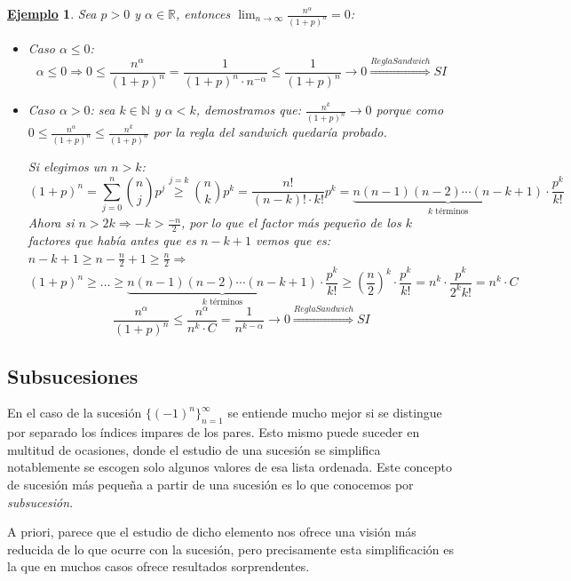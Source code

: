 \documentclass[10pt,a4paper,openright]{book}
\theoremstyle{break}
\newtheorem{ej}{\underline{Ejemplo}}[chapter]
\begin{document}
\begin{ej}
Sea $p>0$ y $\alpha\in \mathbb R$, entonces $\lim_{n\rightarrow\infty}\frac{n^\alpha}{(1+p)^n}=0$:
\begin{itemize}
\item Caso $\alpha\leq 0$:
$$\alpha\leq 0\Rightarrow 0\leq \frac{n^\alpha}{(1+p)^n}=\frac{1}{(1+p)^n\cdot n^{-\alpha}}\leq \frac{1}{(1+p)^n}\rightarrow 0\stackrel{Regla Sandwich}{\Rightarrow} SI$$

\item Caso $\alpha>0$: sea $k\in \mathbb N$ y $\alpha<k$, demostramos que: $\frac{n^k}{(1+p)^n}\rightarrow 0$ porque como  $0\leq \frac{n^\alpha}{(1+p)^n}\leq \frac{n^k}{(1+p)^n}$ por la regla del sandwich quedaría probado.\par

Si elegimos un $n>k$:
$$(1+p)^n=\sum_{j=0}^n \binom{n}{j} p^j \stackrel{j=k}{\geq} \binom{n}{k}p^k=\frac{n!}{(n-k)!\cdot k!}p^k=\underbrace{n(n-1)(n-2)\cdots(n-k+1)}_{k \mbox{ términos}}\cdot \frac{p^k}{k!}$$
Ahora si $n>2k\Rightarrow -k>\frac{-n}{2}$, por lo que el factor más pequeño de los $k$ factores que había antes que es $n-k+1$ vemos que es: $n-k+1\geq n-\frac{n}{2}+1\geq \frac{n}{2} \Rightarrow $
$$(1+p)^n\geq ... \geq \underbrace{n(n-1)(n-2)\cdots (n-k+1)}_{k \mbox{ términos}}\cdot \frac{p^k}{k!}\geq \left(\frac{n}{2}\right)^k\cdot \frac{p^k}{k!}=n^k\cdot \frac{p^k}{2^kk!}=n^k\cdot C$$
$$\frac{n^\alpha}{(1+p)^n}\leq \frac{n^\alpha}{n^k\cdot C}=\frac{1}{n^{k-\alpha}}\rightarrow 0\stackrel{Regla Sandwich}{\Rightarrow} SI$$
\end{itemize}
\end{ej}

\subsection{Subsucesiones}
\label{sub:subsucesiones}

En el caso de la sucesión $\{(-1)^n\}_{n=1}^\infty$ se entiende mucho mejor si se distingue por separado los índices impares de los pares. Esto mismo puede suceder en multitud de ocasiones, donde el estudio de una sucesión se simplifica notablemente se escogen solo algunos valores de esa lista ordenada. Este concepto de sucesión más pequeña a partir de una sucesión es lo que conocemos por \textit{subsucesión}.

A priori, parece que el estudio de dicho elemento nos ofrece una visión más reducida de lo que ocurre con la sucesión, pero precisamente esta simplificación es la que en muchos casos ofrece resultados sorprendentes.
\end{document}

